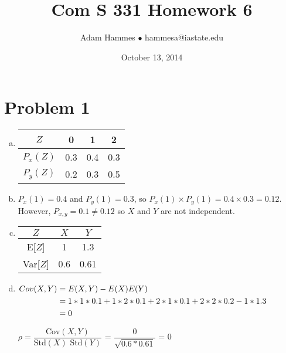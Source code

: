 \documentclass[11pt]{article}
\newenvironment{equ}{$\hfill\begin{aligned}[t]}{\end{aligned}\hfill \null$}
\begin{document}
\title{Com S 331 Homework 6}
\author{Adam Hammes $\bullet$ hammesa@iastate.edu}
\date{October 13, 2014}
\maketitle

\section*{Problem 1}
\begin{enumerate}[(a)]
	\item
		\begin{tabular}{ c | c c c}
			$Z$	& 0 & 1 & 2 \\
			\hline
			$P_x(Z)$ & 0.3 & 0.4 & 0.3 \\
			$P_y(Z)$ & 0.2 & 0.3 & 0.5
		\end{tabular}
		
	\item
		$P_x(1) = 0.4$ and $P_y(1) = 0.3$, so $P_x(1) \times P_y(1) = 0.4 \times 0.3 = 0.12$. However, $P_{x,y} = 0.1 \neq 0.12$ so $X$ and $Y$ are not independent.
		
	\item
		\begin{tabular}{ c | c c }
			$Z$ & $X$ & $Y$ \\
			\hline
			E[$Z$] & 1 & 1.3 \\
			Var[$Z$] & 0.6 & 0.61 
		\end{tabular}
		
	\item 
		\begin{equ}
			Cov(X,Y) &= E(X,Y) - E(X)E(Y) \\
			&= 1*1*0.1 + 1*2*0.1 +2*1*0.1 + 2*2*0.2 - 1*1.3 \\
			&= 0
		\end{equ}
		
		$\rho = \dfrac{\text{Cov}(X,Y)}{\text{Std}(X)\text{ Std}(Y)}$ = $\dfrac{0}{\sqrt{0.6 * 0.61}}$ = 0
\end{enumerate}
\end{document}
